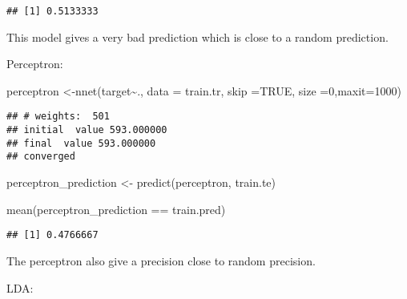 \documentclass[
]{article}
\newenvironment{Shaded}{\begin{snugshade}}{\end{snugshade}}
\newcommand{\AttributeTok}[1]{\textcolor[rgb]{0.77,0.63,0.00}{#1}}
\newcommand{\ConstantTok}[1]{\textcolor[rgb]{0.00,0.00,0.00}{#1}}
\newcommand{\DecValTok}[1]{\textcolor[rgb]{0.00,0.00,0.81}{#1}}
\newcommand{\FunctionTok}[1]{\textcolor[rgb]{0.00,0.00,0.00}{#1}}
\newcommand{\NormalTok}[1]{#1}
\newcommand{\OtherTok}[1]{\textcolor[rgb]{0.56,0.35,0.01}{#1}}
\newcommand{\SpecialCharTok}[1]{\textcolor[rgb]{0.00,0.00,0.00}{#1}}
\begin{document}
\begin{verbatim}
## [1] 0.5133333
\end{verbatim}

This model gives a very bad prediction which is close to a random
prediction.

Perceptron:

\begin{Shaded}
\begin{Highlighting}[]
\NormalTok{perceptron }\OtherTok{\textless{}{-}}\FunctionTok{nnet}\NormalTok{(target}\SpecialCharTok{\textasciitilde{}}\NormalTok{., }\AttributeTok{data =}\NormalTok{ train.tr, }\AttributeTok{skip =}\ConstantTok{TRUE}\NormalTok{, }\AttributeTok{size =}\DecValTok{0}\NormalTok{,}\AttributeTok{maxit=}\DecValTok{1000}\NormalTok{)}
\end{Highlighting}
\end{Shaded}

\begin{verbatim}
## # weights:  501
## initial  value 593.000000 
## final  value 593.000000 
## converged
\end{verbatim}

\begin{Shaded}
\begin{Highlighting}[]
\NormalTok{perceptron\_prediction }\OtherTok{\textless{}{-}} \FunctionTok{predict}\NormalTok{(perceptron, train.te)}

\FunctionTok{mean}\NormalTok{(perceptron\_prediction }\SpecialCharTok{==}\NormalTok{ train.pred)}
\end{Highlighting}
\end{Shaded}

\begin{verbatim}
## [1] 0.4766667
\end{verbatim}

The perceptron also give a precision close to random precision.

LDA:

\begin{Shaded}
\end{Shaded}
\end{document}
